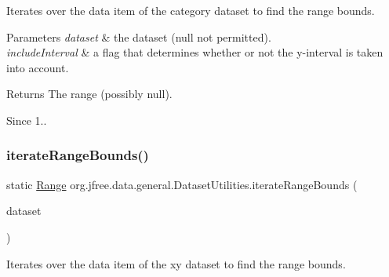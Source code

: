 Iterates over the data item of the category dataset to find the range bounds.


\begin{DoxyParams}{Parameters}
{\em dataset} & the dataset ({\ttfamily null} not permitted). \\
\hline
{\em include\+Interval} & a flag that determines whether or not the y-\/interval is taken into account.\\
\hline
\end{DoxyParams}
\begin{DoxyReturn}{Returns}
The range (possibly {\ttfamily null}).
\end{DoxyReturn}
\begin{DoxySince}{Since}
1.. 
\end{DoxySince}
\mbox{\label{classorg_1_1jfree_1_1data_1_1general_1_1_dataset_utilities_a27af79e63906c96f8420bb5dcdd8b479}} 
\subsubsection{\texorpdfstring{iterate\+Range\+Bounds()}{iterateRangeBounds()}\hspace{0.1cm}{\footnotesize\ttfamily [3/4]}}
{\footnotesize\ttfamily static \mbox{\hyperlink{classorg_1_1jfree_1_1data_1_1_range}{Range}} org.\+jfree.\+data.\+general.\+Dataset\+Utilities.\+iterate\+Range\+Bounds (\begin{DoxyParamCaption}\item[{\mbox{\hyperlink{interfaceorg_1_1jfree_1_1data_1_1xy_1_1_x_y_dataset}{X\+Y\+Dataset}}}]{dataset }\end{DoxyParamCaption})\hspace{0.3cm}{\ttfamily [static]}}

Iterates over the data item of the xy dataset to find the range bounds.


